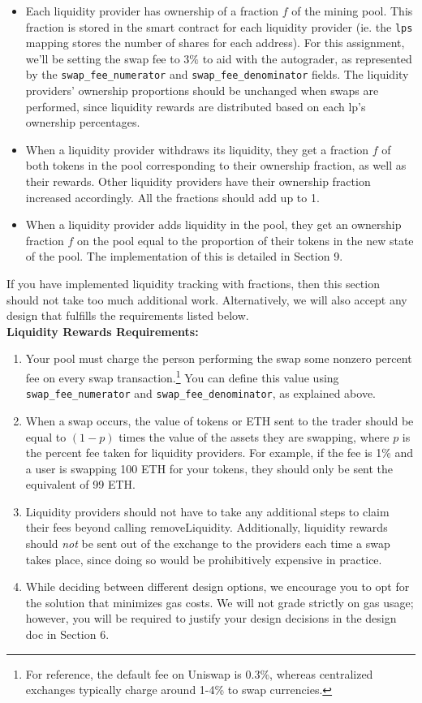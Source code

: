 \documentclass[11pt]{article}
\begin{document}
\begin{itemize}
    \item Each liquidity provider has ownership of a fraction $f$ of the mining pool. This fraction is stored in the smart contract for each liquidity provider (ie. the \texttt{lps} mapping stores the number of shares for each address). For this assignment, we'll be setting the swap fee to $3\%$ to aid with the autograder, as represented by the \texttt{swap\_fee\_numerator} and \texttt{swap\_fee\_denominator} fields. The liquidity providers' ownership proportions should be unchanged when swaps are performed, since liquidity rewards are distributed based on each lp's ownership percentages.
    \item When a liquidity provider withdraws its liquidity, they get a fraction $f$ of both tokens in the pool corresponding to their ownership fraction, as well as their rewards. Other liquidity providers have their ownership fraction increased accordingly. All the fractions should add up to 1. 
    \item When a liquidity provider adds liquidity in the pool, they get an ownership fraction $f$ on the pool equal to the proportion of their tokens in the new state of the pool. The implementation of this is detailed in Section 9.
\end{itemize}
    If you have implemented liquidity tracking with fractions, then this section should not take too much additional work. Alternatively, we will also accept any design that fulfills the requirements listed below. \\

\textbf{Liquidity Rewards Requirements:}
\begin{enumerate}
    \item Your pool must charge the person performing the swap some nonzero percent fee on every swap transaction.\footnote{For reference, the default fee on Uniswap is 0.3\%, whereas centralized exchanges typically charge around 1-4\% to swap currencies.} You can define this value using \texttt{swap\_fee\_numerator} and \texttt{swap\_fee\_denominator}, as explained above.
    \item When a swap occurs, the value of tokens or ETH sent to the trader should be equal to $(1 - p)$ times the value of the assets they are swapping, where $p$ is the percent fee taken for liquidity providers. For example, if the fee is 1\% and a user is swapping 100 ETH for your tokens, they should only be sent the equivalent of 99 ETH.
    \item Liquidity providers should not have to take any additional steps to claim their fees beyond calling removeLiquidity. Additionally, liquidity rewards should \textit{not} be sent out of the exchange to the providers each time a swap takes place, since doing so would be prohibitively expensive in practice.
    \item While deciding between different design options, we encourage you to opt for the solution that minimizes gas costs. We will not grade strictly on gas usage; however, you will be required to justify your design decisions in the design doc in Section 6.
\end{enumerate}
\end{document}
